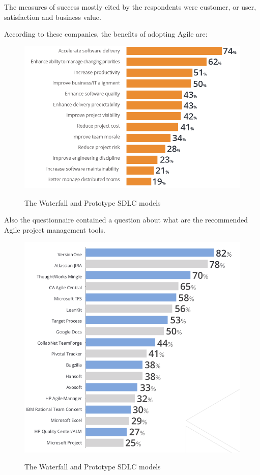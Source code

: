 	The measures of success mostly cited by the respondents were customer, or user, satisfaction and business value.

	According to these companies, the benefits of adopting Agile are:
	\begin{figure}[H]
		\centering
		\includegraphics[width=.8\textwidth]{resources/Untitled}\\
		\caption{The Waterfall and Prototype SDLC models}
	\end{figure}

	Also the questionnaire contained a question about what are the recommended Agile project management tools.
	
	\begin{figure}[H]
		\centering
		\includegraphics[width=.8\textwidth]{resources/Screenshot}\\
		\caption{The Waterfall and Prototype SDLC models}
	\end{figure}

